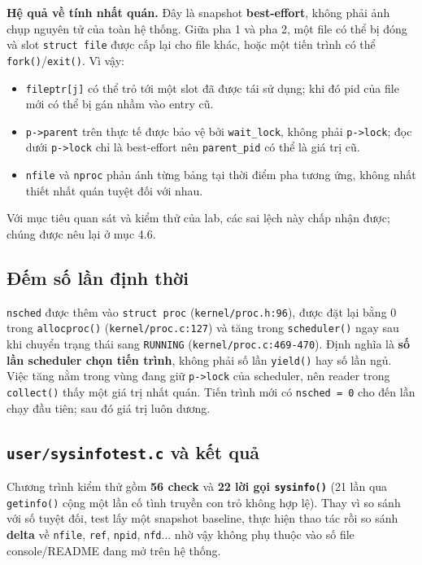 \textbf{Hệ quả về tính nhất quán.} Đây là snapshot \textbf{best-effort}, không phải ảnh chụp nguyên tử của toàn hệ thống. Giữa pha 1 và pha 2, một file có thể bị đóng và slot \texttt{struct file} được cấp lại cho file khác, hoặc một tiến trình có thể \texttt{fork()}/\texttt{exit()}. Vì vậy:

\begin{itemize}[itemsep=0pt, topsep=2.5pt, leftmargin=1.5cm]
    \item \texttt{fileptr[j]} có thể trỏ tới một slot đã được tái sử dụng; khi đó pid của file mới có thể bị gán nhầm vào entry cũ.
    \item \texttt{p->parent} trên thực tế được bảo vệ bởi \texttt{wait\_lock}, không phải \texttt{p->lock}; đọc dưới \texttt{p->lock} chỉ là best-effort nên \texttt{parent\_pid} có thể là giá trị cũ.
    \item \texttt{nfile} và \texttt{nproc} phản ánh từng bảng tại thời điểm pha tương ứng, không nhất thiết nhất quán tuyệt đối với nhau.
\end{itemize}

Với mục tiêu quan sát và kiểm thử của lab, các sai lệch này chấp nhận được; chúng được nêu lại ở mục 4.6.

\subsection{Đếm số lần định thời}

\texttt{nsched} được thêm vào \texttt{struct proc} (\texttt{kernel/proc.h:96}), được đặt lại bằng 0 trong \texttt{allocproc()} (\texttt{kernel/proc.c:127}) và tăng trong \texttt{scheduler()} ngay sau khi chuyển trạng thái sang \texttt{RUNNING} (\texttt{kernel/proc.c:469-470}). Định nghĩa là \textbf{số lần scheduler chọn tiến trình}, không phải số lần \texttt{yield()} hay số lần ngủ. Việc tăng nằm trong vùng đang giữ \texttt{p->lock} của scheduler, nên reader trong \texttt{collect()} thấy một giá trị nhất quán. Tiến trình mới có \texttt{nsched = 0} cho đến lần chạy đầu tiên; sau đó giá trị luôn dương.

\subsection{\texttt{user/sysinfotest.c} và kết quả}

Chương trình kiểm thử gồm \textbf{56 check} và \textbf{22 lời gọi \texttt{sysinfo()}} (21 lần qua \texttt{getinfo()} cộng một lần cố tình truyền con trỏ không hợp lệ). Thay vì so sánh với số tuyệt đối, test lấy một snapshot baseline, thực hiện thao tác rồi so sánh \textbf{delta} về \texttt{nfile}, \texttt{ref}, \texttt{npid}, \texttt{nfd}... nhờ vậy không phụ thuộc vào số file console/README đang mở trên hệ thống.

